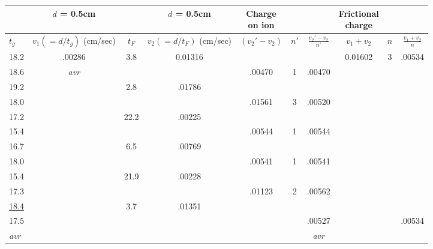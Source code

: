 \documentclass{article}
\begin{document}
\begin{center}
\small
\begin{tabular}{|l|c||c|c|c|c|c|c|c|c|}
\hline
 & $d$ = 0.5cm & & $d$ = 0.5cm & \makecell{Charge\\on ion} & & & \makecell{Frictional\\charge} & & \\
\hline
$t_g$ & \makecell{$v_1(=d/t_g)$\\(cm/sec)} & $t_F$ & \makecell{$v_2(=d/t_F)$\\(cm/sec)} & $(v_{2}'\!-\!v_2)$ & $n'$ & $\frac{v_{2}'-v_2}{n'}$ & $v_1+v_2$ & $n$ & $\frac{v_1+v_2}{n}$\\
\hline
18.2    & .00286 & 3.8 & 0.01316 & & & & 0.01602 & 3 & .00534\\
18.6    & \emph{avr}  & & & .00470 & 1 & .00470 & & & \\
19.2    & & 2.8 & .01786 & & & & & & \\
18.0    & & & & .01561 & 3 & .00520 & & & \\
17.2    & & 22.2 & .00225 & & & & & & \\
15.4    & & & & .00544 & 1 & .00544 & & & \\
16.7    & & 6.5 & .00769 & & & & & & \\
18.0    & & & & .00541 & 1 & .00541 & & & \\
15.4    & & 21.9 & .00228 & & & & & & \\
17.3    & & & & .01123 & 2 & .00562 & & & \\
\underline{18.4}    & & 3.7 & .01351 & & & \underline{\hspace{2em}} & & & \underline{\hspace{2em}} \\
17.5 & & & & & & .00527 & & & .00534 \\
\emph{avr} & & & & & & \emph{avr} & & &\\
\hline
\end{tabular}
\end{center}

\bigskip
\end{document}
